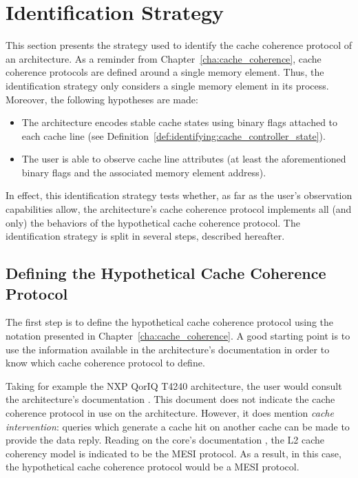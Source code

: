 \section{Identification Strategy}
\label{sec:identification:strategy}
This section presents the strategy used to identify the cache coherence protocol
of an architecture. As a reminder from Chapter~\ref{cha:cache_coherence}, cache
coherence protocols are defined around a single memory element. Thus, the
identification strategy only considers a single memory element in its process.
Moreover, the following hypotheses are made:
\begin{itemize}
\item
   The architecture encodes stable cache states using binary flags attached to
   each cache line (see
   Definition~\ref{def:identifying:cache_controller_state}).
\item
   The user is able to observe cache line attributes (at least the
   aforementioned binary flags and the associated memory element address).
\end{itemize}
\iffalse
Because the user's means of observation are likely to be incomplete, there is
no way to ensure all behaviors of the protocol can be identified: there is
always the possibility of the architecture's cache coherence protocol relying
on something that cannot be observed.
\fi
In effect, this identification strategy tests whether, as far as the user's
observation capabilities allow, the architecture's cache coherence protocol
implements all (and only) the behaviors of the hypothetical cache coherence
protocol. The identification strategy is split in several steps, described
hereafter.

\subsection{Defining the Hypothetical Cache Coherence Protocol}
The first step is to define the hypothetical cache coherence protocol using the
notation presented in Chapter~\ref{cha:cache_coherence}. A good starting point
is to use the information available in the architecture's documentation in order
to know which cache coherence protocol to define.

Taking for example the NXP QorIQ T4240 architecture, the user would consult the
architecture's documentation \cite{T4240}. This document does not indicate the
cache coherence protocol in use on the architecture. However, it does mention
\textit{cache intervention}: queries which generate a cache hit on another cache
can be made to provide the data reply. Reading on the core's documentation
\cite{e6500}, the L2 cache coherency model is indicated to be the MESI protocol.
As a result, in this case, the hypothetical cache coherence protocol would be
a MESI protocol.

